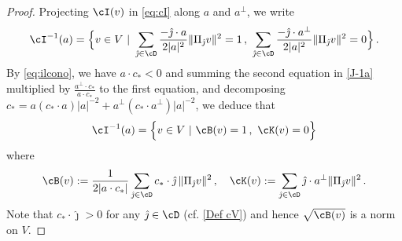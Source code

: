 \documentclass[11pt,a4paper,reqno]{article}
\numberwithin{equation}{section}
\theoremstyle{definition}
\begin{document}
        \begin{proof} 
       
    Projecting  $ \cI (v) $ in \eqref{eq:cI}  
       along  $ a $ and 
       $ a^\bot $, 
    we write
    \begin{equation}
    \label{J-1a}
    \cI^{-1} (a) 
    = \Big\{ v\in V \ | \
    \sum_{\hat \jmath\in \cD}\frac{-\hat \jmath \cdot a}{2|a|^2}\|\Pi_{\hat \jmath}v\|^2=1 \, ,  \ \sum_{\hat \jmath\in \cD}\frac{-\hat \jmath \cdot a^\bot}{2|a|^2}\|\Pi_{\hat \jmath}v\|^2=0 
    \Big\} \, . 
\end{equation}
By \eqref{eq:ilcono}, 
we have $a\cdot c_*<0 $ and
 summing the second equation in \eqref{J-1a} multiplied by $\frac{ a^\bot\cdot c_*}{a\cdot c_*}$ to the first equation, 
 and decomposing  $  c_* = 
a (c_* \cdot a)|a|^{-2} + a^\bot 
(c_* \cdot a^\bot) |a|^{-2} $, we deduce that 
\begin{equation}\label{J-2a}
  \cI^{-1} (a)  = \Big\{ v\in V \ | \
    \cB(v)=1 \, ,  \ \cK(v)=0 
    \Big\}
    \end{equation}
    where
     \begin{equation}\label{cBcK}
            \cB(v):=\frac{1}{2|a\cdot c_*|}\sum_{\hat \jmath\in \cD} c_*\cdot \hat \jmath \, \|\Pi_{\hat \jmath} v\|^2 \, , \quad 
            \cK(v):=\sum_{\hat \jmath \in \cD} \hat \jmath \cdot a^\bot \|\Pi_{\hat \jmath} v\|^2\, .
    \end{equation}
    Note that $c_*\cdot \hat \jmath  >0$ for any $ \hat \jmath \in \cD$ (cf. \eqref{Def cV}) and hence $ \sqrt{\cB(v)}$ is a norm on $ V $. 


\end{proof}
\end{document}
